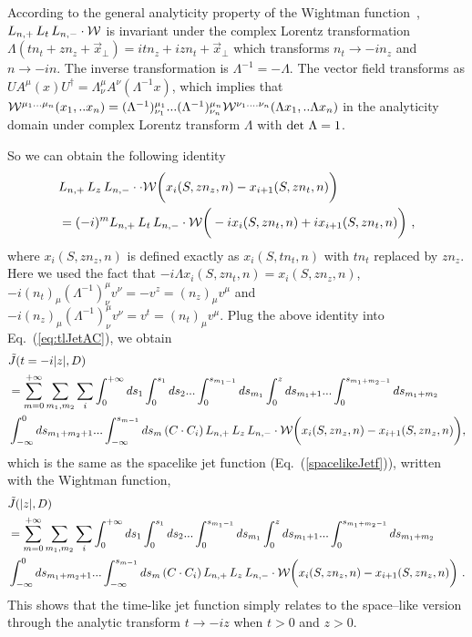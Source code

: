 \documentclass[a4paper,11pt]{article}
\begin{document}
According to the general analyticity property of the Wightman function~\cite{Streater:1989vi}, $L_{n,+}\, L_{t} \, L_{n,-} \cdot {\cal W}$ is invariant under the complex Lorentz transformation ${\Lambda}(tn_t+zn_z+\vec{x}_{\perp})=itn_z+izn_t+{\vec x}_{\perp}$ which transforms $n_t \rightarrow -in_z$ and $n \rightarrow -in$. The inverse transformation is $\Lambda^{-1}=-\Lambda$. The vector field transforms as $UA^{\mu}(x)U^{\dagger}=\Lambda^{\mu}_{\nu}A^{\nu}(\Lambda^{-1}x)$, which implies that ${\cal W}^{\mu_1...\mu_n}(x_1,..x_n)=(\Lambda^{-1})^{\mu_1}_{\nu_1}...(\Lambda^{-1})^{\mu_n}_{\nu_n}{\cal W}^{\nu_1....\nu_n}(\Lambda x_1,..\Lambda x_n)$ in the analyticity domain under complex Lorentz transform $\Lambda$ with ${\rm det} \  \Lambda=1$.

So we can obtain the following identity
\begin{align}
&L_{n,+}\, L_{z} \, L_{n,-} \cdot \cdot {\cal W}\bigg(x_i(S,zn_z,n)-x_{i+1}(S,zn_t,n)\bigg)
\nonumber \\
&= (-i)^m L_{n,+}\, L_{t} \, L_{n,-} \cdot {\cal W}\bigg(-ix_i(S,zn_t,n)+ix_{i+1}(S,zn_t,n)\bigg) \ ,
\end{align}
where $x_i(S,zn_z,n)$ is defined exactly as $x_i(S,tn_t,n)$ with $tn_t$ replaced by $zn_z$. Here we used the fact that $-i\Lambda x_i(S,zn_t,n)=x_i(S,zn_z,n)$, $-i(n_t)_{\mu}(\Lambda^{-1})^{\mu}_{\nu}v^{\nu}=-v^z=(n_z)_{\mu}v^{\mu}$ and $-i(n_z)_{\mu}(\Lambda^{-1})^{\mu}_{\nu}v^{\nu}=v^t=(n_t)_{\mu}v^{\mu}$. Plug the above identity into Eq.~(\ref{eq:tlJetAC}), we obtain
\begin{align}
&\tilde J(t=-i |z|,D)\nonumber\\
&=\sum_{m=0}^{+\infty} \sum_{m_1,m_2} \sum_{i} \int^{+ \infty}_{0} d s_1 \int^{s_1}_{0} d s_2 ... \int^{s_{m_1-1}}_{0} d s_{m_1} 
\int^{z}_{0} d s_{m_1+1} ... \int^{s_{m_1+m_2-1}}_{0} d s_{m_1+m_2} \nonumber\\
&\int^{0}_{-\infty} d s_{m_1+m_2+1} ... \int^{s_{m-1}}_{-\infty} d s_{m}
\left(C \cdot C_{i}\right) L_{n,+}\, L_{z} \, L_{n,-} \cdot
{\cal W}\bigg(x_i(S,zn_z,n)-x_{i+1}(S,zn_z,n)\bigg),
\end{align}
which is the same as the spacelike jet function (Eq.~(\ref{spacelikeJetf})), written with the Wightman function,
\begin{align}
&\tilde J(|z|,D)\nonumber\\
&=\sum_{m=0}^{+\infty} \sum_{m_1,m_2} \sum_{i} \int^{+ \infty}_{0} d s_1 \int^{s_1}_{0} d s_2 ... \int^{s_{m_1-1}}_{0} d s_{m_1} 
\int^{z}_{0} d s_{m_1+1} ... \int^{s_{m_1+m_2-1}}_{0} d s_{m_1+m_2} \nonumber\\
&\int^{0}_{-\infty} d s_{m_1+m_2+1} ... \int^{s_{m-1}}_{-\infty} d s_{m}
\left(C \cdot C_{i}\right) L_{n,+}\, L_{z} \, L_{n,-} \cdot
{\cal W}\bigg(x_i(S,zn_z,n)-x_{i+1}(S,zn_z,n)\bigg) \ .
\end{align}
This shows that the time-like jet function simply relates to the space--like version through the analytic transform $t\rightarrow -iz$ when $t>0$ and $z>0$.
\end{document}
